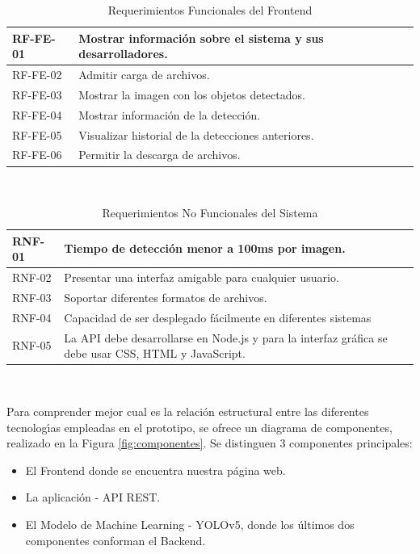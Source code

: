 \begin{table}[h!]
    \begin{tabular}{ | p{2cm} |p{10cm}| }
        \hline
        \rowcolor[HTML]{d6d8ff}
        RF-FE-01 & Mostrar información sobre el sistema y sus desarrolladores.\\
        \hline
        RF-FE-02 & Admitir carga de archivos.\\
        \hline
        \rowcolor[HTML]{d6d8ff}
        RF-FE-03 & Mostrar la imagen con los objetos detectados.\\
        \hline
        RF-FE-04 & Mostrar información de la detección.\\
        \hline
        \rowcolor[HTML]{d6d8ff}
        RF-FE-05 & Visualizar historial de la detecciones anteriores.\\
        \hline
        RF-FE-06 & Permitir la descarga de archivos.\\
        \hline
    \end{tabular}\\
    \caption{Requerimientos Funcionales del Frontend}
    \label{reqfend}
\end{table}

\begin{table}[h!]
    \begin{tabular}{ | p{2cm} |p{10cm}| }
        \hline
        \rowcolor[HTML]{d6d8ff}
        RNF-01 & Tiempo de detección menor a 100ms por imagen.\\
        \hline
        RNF-02 & Presentar una interfaz amigable para cualquier usuario.\\
        \hline
        \rowcolor[HTML]{d6d8ff}
        RNF-03 & Soportar diferentes formatos de archivos. \\
        \hline
        RNF-04 & Capacidad de ser desplegado fácilmente en diferentes sistemas\\
        \hline
        \rowcolor[HTML]{d6d8ff}
        RNF-05 & La API debe desarrollarse en Node.js y para la interfaz gráfica se debe usar CSS, HTML y JavaScript.\\
        \hline
    \end{tabular}\\
    \caption{Requerimientos No Funcionales del Sistema}
    \label{reqnf}
\end{table}

\newpage
Para comprender mejor cual es la relación estructural entre las diferentes tecnologı́as empleadas en el prototipo, se ofrece un diagrama de componentes, realizado en la Figura \ref{fig:componentes}. Se distinguen 3 componentes principales:
\begin{itemize}
    \item El Frontend donde se encuentra nuestra página web.
    \item La aplicación - API REST.
    \item El Modelo de Machine Learning - YOLOv5, donde los últimos dos componentes conforman el Backend.
\end{itemize}

